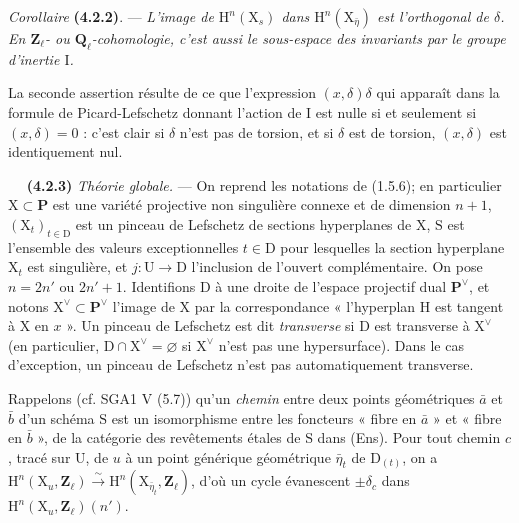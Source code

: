 \documentclass[11pt,leqno]{article}
\newcommand{\Page}[1]{\ifvmode\noindent\else\unskip\ \fi{\footnotesize\textcolor{gray}{[p.\,#1]}}\ \ignorespaces}
\begin{document}
\textit{Corollaire} \textbf{(4.2.2)}. — \textit{L’image de \(\mathrm{H}^n(\mathrm{X}_s)\) dans \(\mathrm{H}^n(\mathrm{X}_{\bar\eta})\) est l’orthogonal de \(\delta\). En \(\mathbf{Z}_\ell\)- ou \(\mathbf{Q}_\ell\)-cohomologie, c’est aussi le sous-espace des invariants par le groupe d’inertie \(\mathrm{I}\).}

La seconde assertion résulte de ce que l’expression \((x,\delta)\delta\) qui apparaît dans la formule de Picard-Lefschetz donnant l’action de \(\mathrm{I}\) est nulle si et seulement si \((x,\delta)=0\) : c’est clair si \(\delta\) n’est pas de torsion, et si \(\delta\) est de torsion, \((x,\delta)\) est identiquement nul.

\Page{220}
\textbf{(4.2.3)} \textit{Théorie globale.} — On reprend les notations de (1.5.6); en particulier \(\mathrm{X}\subset\mathbf{P}\) est une variété projective non singulière connexe et de dimension \(n+1\), \((\mathrm{X}_t)_{t\in\mathrm{D}}\) est un pinceau de Lefschetz de sections hyperplanes de \(\mathrm{X}\), \(\mathrm{S}\) est l’ensemble des valeurs exceptionnelles \(t\in\mathrm{D}\) pour lesquelles la section hyperplane \(\mathrm{X}_t\) est singulière, et \(j:\mathrm{U}\to\mathrm{D}\) l’inclusion de l’ouvert complémentaire. On pose \(n=2n'\) ou \(2n'+1\). Identifions \(\mathrm{D}\) à une droite de l’espace projectif dual \(\mathbf{P}^{\vee}\), et notons \(\mathrm{X}^{\vee}\subset\mathbf{P}^{\vee}\) l’image de \(\mathrm{X}\) par la correspondance « l’hyperplan \(\mathrm{H}\) est tangent à \(\mathrm{X}\) en \(x\) ». Un pinceau de Lefschetz est dit \textit{transverse} si \(\mathrm{D}\) est transverse à \(\mathrm{X}^{\vee}\) (en particulier, \(\mathrm{D}\cap\mathrm{X}^{\vee}=\varnothing\) si \(\mathrm{X}^{\vee}\) n’est pas une hypersurface). Dans le cas d’exception, un pinceau de Lefschetz n’est pas automatiquement transverse.

Rappelons (cf. SGA1 V (5.7)) qu’un \textit{chemin} entre deux points géométriques \(\bar a\) et \(\bar b\) d’un schéma \(\mathrm{S}\) est un isomorphisme entre les foncteurs « fibre en \(\bar a\) » et « fibre en \(\bar b\) », de la catégorie des revêtements étales de \(\mathrm{S}\) dans (Ens). Pour tout chemin \(c\), tracé sur \(\mathrm{U}\), de \(u\) à un point générique géométrique \(\bar\eta_t\) de \(\mathrm{D}_{(t)}\), on a \(\mathrm{H}^n(\mathrm{X}_u,\mathbf{Z}_\ell)\xrightarrow{\sim}\mathrm{H}^n(\mathrm{X}_{\bar\eta_t},\mathbf{Z}_\ell)\), d’où un cycle évanescent \(\pm\delta_c\) dans \(\mathrm{H}^n(\mathrm{X}_u,\mathbf{Z}_\ell)(n')\).
\end{document}
